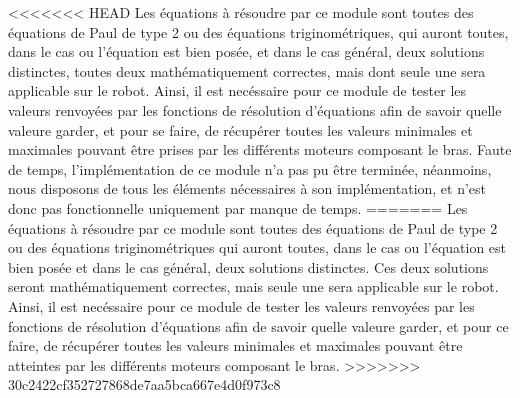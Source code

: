 <<<<<<< HEAD
Les équations à résoudre par ce module sont toutes des équations de Paul de type 2 ou des équations triginométriques, qui auront toutes, dans le cas ou l'équation est bien posée, et dans le cas général, deux solutions distinctes, toutes deux mathématiquement correctes, mais dont seule une sera applicable sur le robot. Ainsi, il est necéssaire pour ce module de tester les valeurs renvoyées par les fonctions de résolution d'équations afin de savoir quelle valeure garder, et pour se faire, de récupérer toutes les valeurs minimales et maximales pouvant être prises par les différents moteurs composant le bras.
\newpage
Faute de temps, l'implémentation de ce module n'a pas pu être terminée, néanmoins, nous disposons de tous les éléments nécessaires à son implémentation, et n'est donc pas fonctionnelle uniquement par manque de temps.
=======
Les équations à résoudre par ce module sont toutes des équations de Paul de type 2 ou des équations triginométriques qui auront toutes, dans le cas ou l'équation est bien posée et dans le cas général, deux solutions distinctes. Ces deux solutions seront mathématiquement correctes, mais seule une sera applicable sur le robot. Ainsi, il est necéssaire pour ce module de tester les valeurs renvoyées par les fonctions de résolution d'équations afin de savoir quelle valeure garder, et pour ce faire, de récupérer toutes les valeurs minimales et maximales pouvant être atteintes par les différents moteurs composant le bras.
>>>>>>> 30c2422cf352727868de7aa5bca667e4d0f973c8
